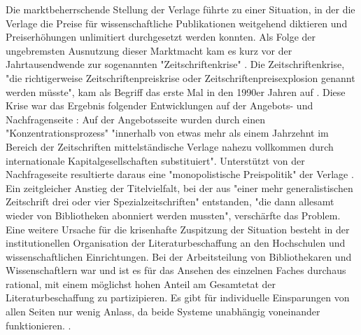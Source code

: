Die marktbeherrschende Stellung der Verlage führte zu einer Situation, in der die Verlage die Preise für wissenschaftliche Publikationen weitgehend diktieren und Preiserhöhungen unlimitiert durchgesetzt werden konnten. Als Folge der ungebremsten Ausnutzung dieser Marktmacht kam es kurz vor der Jahrtausendwende zur sogenannten "Zeitschriftenkrise" \cite{muller_2010_open} \cite{schirmbacher_2009_wisspub} \cite{Parks_2002_acadamic_faust}. Die Zeitschriftenkrise, "die richtigerweise Zeitschriftenpreiskrise oder Zeitschriftenpreisexplosion genannt werden müsste"\cite {Brintzinger_2010}, kam als Begriff das erste Mal in den 1990er Jahren auf \cite{Boni_2010}. Diese Krise war das Ergebnis folgender Entwicklungen auf der Angebots- und Nachfragenseite \cite{Brintzinger_2010}: Auf der Angebotsseite wurden durch einen "Konzentrationsprozess" "innerhalb von etwas mehr als einem Jahrzehnt im Bereich der Zeitschriften mittelständische Verlage nahezu vollkommen durch internationale Kapitalgesellschaften substituiert". \cite{Brintzinger_2010} Unterstützt von der Nachfrageseite resultierte daraus eine "monopolistische Preispolitik" der Verlage \cite{Brintzinger_2010}. Ein zeitgleicher Anstieg der Titelvielfalt, bei der aus "einer mehr generalistischen Zeitschrift drei oder vier Spezialzeitschriften" entstanden, "die dann allesamt wieder von Bibliotheken abonniert werden mussten"\cite{Brintzinger_2010}, verschärfte das Problem. Eine weitere Ursache für die krisenhafte Zuspitzung der Situation besteht in der institutionellen Organisation der Literaturbeschaffung an den Hochschulen und wissenschaftlichen Einrichtungen. Bei der Arbeitsteilung von Bibliothekaren und Wissenschaftlern war und ist es für das Ansehen des einzelnen Faches durchaus rational, mit einem möglichst hohen Anteil am Gesamtetat der Literaturbeschaffung zu partizipieren. Es gibt für individuelle Einsparungen von allen Seiten nur wenig Anlass, da beide Systeme unabhängig voneinander funktionieren. \cite{Brintzinger_2010}.

